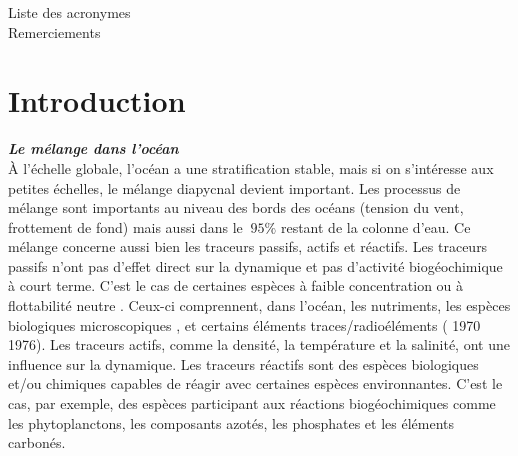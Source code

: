 \documentclass[a4paper,12pt]{article}
\begin{document}

\newpage
Liste des acronymes \\
Remerciements\\

\newpage
\section{Introduction}

    \textbf{\textit{Le mélange dans l'océan}} \\
    À l'échelle globale, l'océan a une stratification stable, mais si on s'intéresse aux petites échelles, le mélange diapycnal devient important. Les processus de mélange sont importants au niveau des bords des océans (tension du vent, frottement de fond) mais aussi dans le $~95\%$ restant de la colonne d'eau. Ce mélange concerne aussi bien les traceurs passifs, actifs et réactifs. Les traceurs passifs n'ont pas d'effet direct sur la dynamique et pas d'activité biogéochimique à court terme. C'est le cas de certaines espèces à faible concentration ou à flottabilité neutre \citep{warhaft_passive_2000,canuto_vertical_2011}. Ceux-ci comprennent, dans l'océan, les nutriments, les espèces biologiques microscopiques \citep{vaquer-sunyer_thresholds_2008,brierley_impacts_2009}, et certains éléments traces/radioéléments (\cite{broecker_distribution_nodate} 1970 1976). Les traceurs actifs, comme la densité, la température et la salinité, ont une influence sur la dynamique. Les traceurs réactifs sont des espèces biologiques et/ou chimiques capables de réagir avec certaines espèces environnantes. C'est le cas, par exemple, des espèces participant aux réactions biogéochimiques comme les phytoplanctons, les composants azotés, les phosphates et les éléments carbonés. 
    \\
\end{document}
